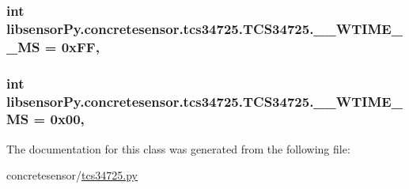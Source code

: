 \subsubsection[{\+\_\+\+\_\+\+W\+T\+I\+M\+E\+\_\+2\+\_\+4\+M\+S}]{\setlength{\rightskip}{0pt plus 5cm}int libsensor\+Py.\+concretesensor.\+tcs34725.\+T\+C\+S34725.\+\_\+\+\_\+\+W\+T\+I\+M\+E\+\_\+\_\+M\+S = 0x\+F\+F\hspace{0.3cm}{\ttfamily [static]}, {\ttfamily [private]}}\label{classlibsensorPy_1_1concretesensor_1_1tcs34725_1_1TCS34725_a52576da78baa8295d02a024caad30e5f}
\hypertarget{classlibsensorPy_1_1concretesensor_1_1tcs34725_1_1TCS34725_ad606986091b4ef12bc6a638400275d0c}{}
\subsubsection[{\+\_\+\+\_\+\+W\+T\+I\+M\+E\+\_\+614\+M\+S}]{\setlength{\rightskip}{0pt plus 5cm}int libsensor\+Py.\+concretesensor.\+tcs34725.\+T\+C\+S34725.\+\_\+\+\_\+\+W\+T\+I\+M\+E\+\_\+M\+S = 0x00\hspace{0.3cm}{\ttfamily [static]}, {\ttfamily [private]}}\label{classlibsensorPy_1_1concretesensor_1_1tcs34725_1_1TCS34725_ad606986091b4ef12bc6a638400275d0c}


The documentation for this class was generated from the following file\+:\begin{DoxyCompactItemize}
\item 
concretesensor/\hyperlink{tcs34725_8py}{tcs34725.\+py}\end{DoxyCompactItemize}
